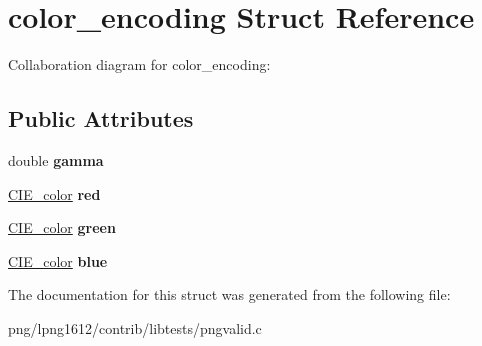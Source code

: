 \hypertarget{structcolor__encoding}{\section{color\+\_\+encoding Struct Reference}
\label{structcolor__encoding}
}


Collaboration diagram for color\+\_\+encoding\+:
\subsection*{Public Attributes}
\begin{DoxyCompactItemize}
\item 
\hypertarget{structcolor__encoding_a32afbb27f3cb20a9737ba8ba57d17e52}{double {\bfseries gamma}}\label{structcolor__encoding_a32afbb27f3cb20a9737ba8ba57d17e52}

\item 
\hypertarget{structcolor__encoding_a4ffa4b5772bb90ceda589cbc4d4167f8}{\hyperlink{struct_c_i_e__color}{C\+I\+E\+\_\+color} {\bfseries red}}\label{structcolor__encoding_a4ffa4b5772bb90ceda589cbc4d4167f8}

\item 
\hypertarget{structcolor__encoding_a3930a990e8786253bb7360ea4518233e}{\hyperlink{struct_c_i_e__color}{C\+I\+E\+\_\+color} {\bfseries green}}\label{structcolor__encoding_a3930a990e8786253bb7360ea4518233e}

\item 
\hypertarget{structcolor__encoding_a2c339834762f0fc567d7e1f3bbfcb8fc}{\hyperlink{struct_c_i_e__color}{C\+I\+E\+\_\+color} {\bfseries blue}}\label{structcolor__encoding_a2c339834762f0fc567d7e1f3bbfcb8fc}

\end{DoxyCompactItemize}


The documentation for this struct was generated from the following file\+:\begin{DoxyCompactItemize}
\item 
png/lpng1612/contrib/libtests/pngvalid.\+c\end{DoxyCompactItemize}
